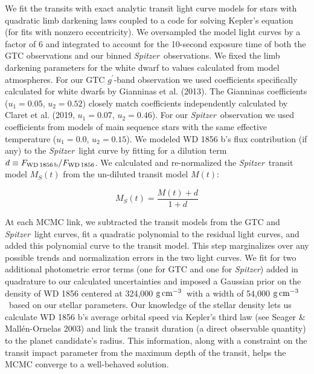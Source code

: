 \documentclass{nature3}
\newcommand*{\bedit}{\textcolor{new_black}}
\newcommand{\project}[1]{\textsl{#1}}
\newcommand{\Spitzer}{\project{Spitzer}}
\newcommand{\gcc}{\ensuremath{\rm g\,cm^{-3}}}
\begin{document}
\begin{methods}
We fit the transits with \bedit{exact} analytic transit light curve models\cite{MandelAgol:2002} \bedit{for stars with quadratic limb darkening laws} coupled to a code for solving Kepler's equation\cite{Eastman:2013} (for fits with nonzero eccentricity). We oversampled the model light curves by a factor of 6 and integrated to account for the 10-second exposure time of both the GTC observations and our binned \Spitzer\ observations. We fixed the limb darkening parameters for the white dwarf to values calculated from model atmospheres. For our GTC $g^\prime$-band observation we used coefficients specifically calculated for white dwarfs \bedit{by Gianninas et al. (2013\cite{Gianninas13}). The Gianninas coefficients ($u_1 = 0.05$, $u_2 = 0.52$) closely match coefficients independently calculated by Claret et al. (2019\cite{Claret2019}, $u_1 = 0.07$, $u_2 = 0.46$)}. For our \Spitzer\ observation we used coefficients from models of main sequence stars with the same effective temperature\cite{claret2011} \bedit{($u_1 =0.0$, $u_2 = 0.15$)}.  We modeled WD 1856 b's flux contribution (if any) to the \Spitzer\ light curve by fitting for a dilution term $d \equiv F_{\rm WD\,1856\,b}/F_{\rm WD\,1856}$. We calculated and re-normalized the \Spitzer\ transit model $M_{S}(t)$ from the un-diluted transit model $M(t)$:

\begin{equation}
    M_{S}(t) = \frac{M(t) + d}{1 + d}
\end{equation}

At each MCMC link, we subtracted the transit models from the GTC and \Spitzer\ light curves, fit a quadratic polynomial to the residual light curves, and added this polynomial curve to the transit model. This step marginalizes over any possible trends and normalization errors in the two light curves. We fit for two additional photometric error terms (one for GTC and one for \Spitzer) added in quadrature to our calculated uncertainties and imposed a \bedit{Gaussian} prior on the density of WD 1856 centered at 324,000 \gcc\ with a width of 54,000 \gcc\ based on our stellar parameters. \bedit{Our knowledge of the stellar density lets us calculate WD 1856 b's average orbital speed via Kepler's third law (see Seager \& Mall\'en-Ornelas 2003\cite{SeagerMallenOrnelas2003}) and link the transit duration (a direct observable quantity) to the planet candidate's radius. This information, along with a constraint on the transit impact parameter from the maximum depth of the transit, helps the MCMC converge to a well-behaved solution. }


\end{methods}
\end{document}
